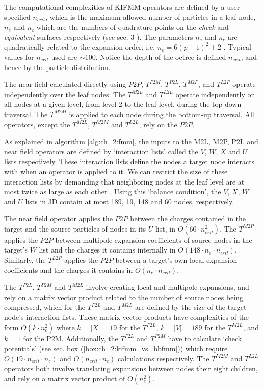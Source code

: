 The computational complexities of KIFMM operators are defined by a user specified $n_{crit}$, which is the maximum allowed number of particles in a leaf node, $n_e$ and $n_c$ which are the numbers of quadrature points on the \textit{check} and \textit{equivalent} surfaces respectively (see sec. 3 \cite{Ying:2004:JCP}). The parameters $n_e$ and $n_c$ are quadratically related to the expansion order, i.e. $n_e = 6(p-1)^2 + 2$ \cite{Ying:2004:JCP}. Typical values for $n_{crit}$ used are $\sim 100$. Notice the depth of the octree is defined $n_{crit}$, and hence by the particle distribution.

The near field calculated directly using $P2P$, $T^{P2M}$, $T^{P2L}$, $T^{M2P}$, and $T^{L2P}$ operate independently over the leaf nodes. The $T^{M2L}$ and $T^{L2L}$ operate independently on all nodes at a given level, from level 2 to the leaf level, during the top-down traversal. The $T^{M2M}$ is applied to each node during the bottom-up traversal. All operators, except the $T^{M2L}$, $T^{M2M}$ and $T^{L2L}$, rely on the $P2P$. 

As explained in algorithm \ref{alg:ch_2:fmm}, the inputs to the M2L, M2P, P2L and near field operators are defined by `interaction lists' called the $V$, $W$, $X$ and $U$ lists respectively.  These interaction lists define the nodes a target node interacts with when an operator is applied to it. We can restrict the size of these interaction lists by demanding that neighboring nodes at the leaf level are at most twice as large as each other \cite{sundar2008bottom}. Using this `balance condition', the $V$, $X$, $W$ and $U$ lists in 3D contain at most 189, 19, 148 and 60 nodes, respectively.

The near field operator applies the $P2P$ between the charges contained in the target and the source particles of nodes in its $U$ list, in $O(60 \cdot n_{crit}^2)$. The $T^{M2P}$ applies the $P2P$ between multipole expansion coefficients of source nodes in the target's $W$ list and the charges it contains internally in $O(148 \cdot n_e \cdot n_{crit})$. Similarly, the $T^{L2P}$ applies the $P2P$ between a target's own local expansion coefficients and the charges it contains in $O(n_e \cdot n_{crit})$.

The $T^{P2L}$, $T^{P2M}$ and $T^{M2L}$ involve creating local and multipole expansions, and rely on a matrix vector product related to the number of source nodes being compressed, which for the $T^{P2L}$ and $T^{M2L}$ are defined by the size of the target node's interaction lists. These matrix vector products have complexities of the form $O(k \cdot n_e^2)$ where $k = |X| = 19$ for the $T^{P2L}$, $k = |V| = 189$ for the $T^{M2L}$, and $k = 1$ for the P2M. Additionally, the $T^{P2L}$ and $T^{P2M}$ have to calculate `check potentials' (see sec. box (\ref{box:ch_2:kifmm_vs_bbfmm})) which require $O(19 \cdot n_{crit} \cdot n_c)$ and $O(n_{crit} \cdot n_c)$ calculations respectively. The $T^{M2M}$ and $T^{L2L}$ operators both involve translating expansions between nodes their eight children, and rely on a matrix vector product of $O(n_e^2)$.

